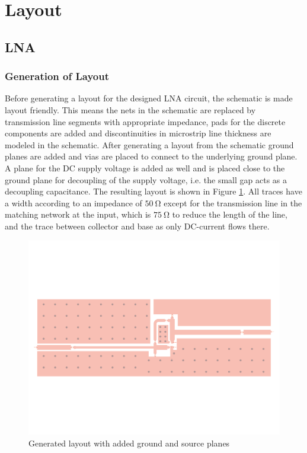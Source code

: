 \documentclass[a4paper]{article}        %
\begin{document}
\section{Layout}
	\subsection{LNA}
		\subsubsection{Generation of Layout}
			Before generating a layout for the designed LNA circuit, the schematic is made layout friendly. This means the nets in the schematic are replaced by transmission line segments with appropriate impedance, pads for the discrete components are added and discontinuities in microstrip line thickness are modeled in the schematic. After generating a layout from the schematic ground planes are added and vias are placed to connect to the underlying ground plane. A plane for the DC supply voltage is added as well and is placed close to the ground plane for decoupling of the supply voltage, i.e. the small gap acts as a decoupling capacitance. The resulting layout is shown in Figure \ref{fig:lna_layout}. All traces have a width according to an impedance of $\SI{50}{\ohm}$ except for the transmission line in the matching network at the input, which is $\SI{75}{\ohm}$ to reduce the length of the line, and the trace between collector and base as only DC-current flows there. 

			\begin{figure}[H]
			\centering
				\includegraphics[width=\textwidth]{fig/LNA/LNA_layout.pdf}
				\caption{Generated layout with added ground and source planes}
				\label{fig:lna_layout}
			\end{figure}
\end{document}
